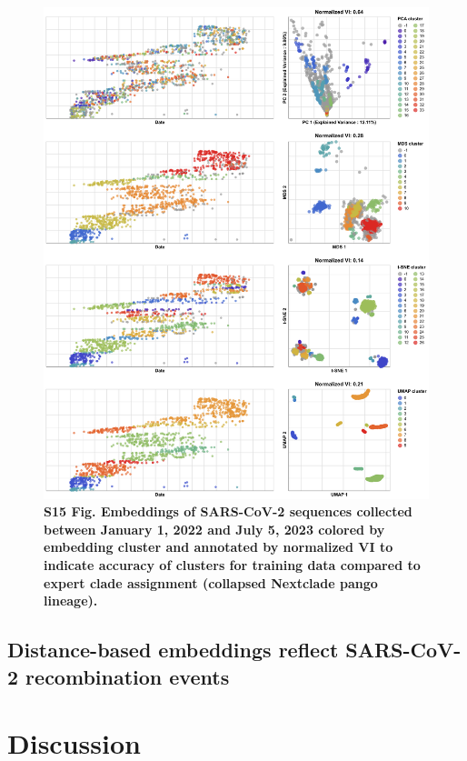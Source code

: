 \documentclass[10pt,letterpaper]{article}
\begin{document}
\begin{figure}[!h]
\includegraphics[width=\columnwidth]{figures/sarscov2-test-embeddings-by-cluster-vs-Nextclade_pango_collapsed.png}
\caption*{{\bf S15 Fig. Embeddings of SARS-CoV-2 sequences collected between January 1, 2022 and July 5, 2023 colored by embedding cluster and annotated by normalized VI to indicate accuracy of clusters for training data compared to expert clade assignment (collapsed Nextclade pango lineage).}}
\end{figure}

\subsection*{Distance-based embeddings reflect SARS-CoV-2 recombination events}

\section*{Discussion}
\end{document}
